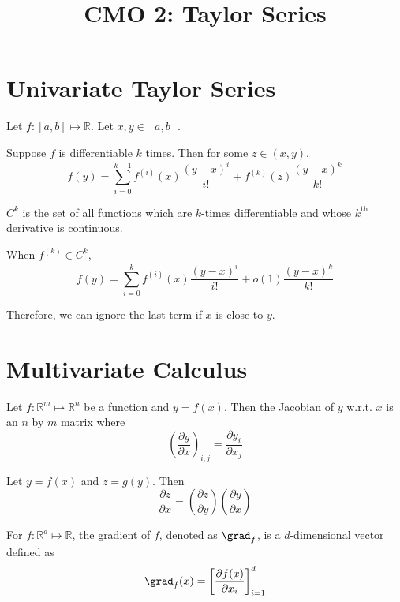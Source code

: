 


\title{CMO 2: Taylor Series}



\maketitle
\initMinimal{}
\tableofcontents

\section{Univariate Taylor Series}

Let $f: [a,b] \mapsto \mathbb{R}$.
Let $x, y \in [a, b]$.

Suppose $f$ is differentiable $k$ times. Then for some $z \in (x, y)$,
\[ f(y) = \sum_{i=0}^{k-1}f^{(i)}(x)\frac{(y-x)^i}{i!} + f^{(k)}(z)\frac{(y-x)^k}{k!} \]

$C^k$ is the set of all functions which are $k$-times differentiable
and whose $k^{\textrm{th}}$ derivative is continuous.

When $f^{(k)} \in C^k$,
\[ f(y) = \sum_{i=0}^k f^{(i)}(x)\frac{(y-x)^i}{i!} + o(1)\frac{(y-x)^k}{k!} \]

Therefore, we can ignore the last term if $x$ is close to $y$.

\section{Multivariate Calculus}

\begin{definition} Let $f: \mathbb{R}^m \mapsto \mathbb{R}^n$ be a function and $y = f(x)$.
Then the Jacobian of $y$ w.r.t. $x$ is an $n$ by $m$ matrix where
\[ \left(\frac{\partial y}{\partial x}\right)_{i, j} = \frac{\partial y_i}{\partial x_j} \]
\end{definition}

\begin{theorem}
\label{thm:chain-rule}
Let $y = f(x)$ and $z = g(y)$. Then
\[ \frac{\partial z}{\partial x}
= \left( \frac{\partial z}{\partial y} \right) \left( \frac{\partial y}{\partial x} \right) \]
\end{theorem}

\begin{definition} For $f: \mathbb{R}^d \mapsto \mathbb{R}$,
the gradient of $f$, denoted as $\grad_f$, is a $d$-dimensional vector defined as
\[ \grad_f(x) = \left[ \frac{\partial f(x)}{\partial x_i} \right]_{i=1}^d \]
\end{definition}

